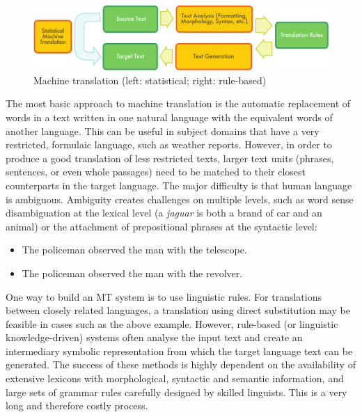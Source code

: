 \begin{multicols}{2}
\begin{figure}[htb]
  \center
  \includegraphics[width=\textwidth]{../_media/english/machine_translation}
  \caption{Machine translation (left: statistical; right: rule-based)}
  \label{fig:mtarch_en}
\end{figure}


The most basic approach to machine translation is the automatic replacement of words in a text written in one natural language with the equivalent words of another language. This can be useful in subject domains that have a very restricted, formulaic language, such as weather reports. However, in order to produce a good translation of less restricted texts, larger text units (phrases, sentences, or even whole passages) need to be matched to their closest counterparts in the target language. The major difficulty is that human language is ambiguous. Ambiguity creates challenges on multiple levels, such as word sense disambiguation at the lexical level (a \textit{jaguar} is both a brand of car and an animal) or the attachment of prepositional phrases at the syntactic level:

\begin{itemize}
\item The policeman observed the man with the telescope.
\item The policeman observed the man with the revolver.
\end{itemize}

One way to build an MT system is to use linguistic rules. For translations between closely related languages, a translation using direct substitution may be feasible in cases such as the above example. However, rule-based (or linguistic knowledge-driven) systems often analyse the input text and create an intermediary symbolic representation from which the target language text can be generated. The success of these methods is highly dependent on the availability of extensive lexicons with morphological, syntactic and semantic information, and large sets of grammar rules carefully designed by skilled linguists. This is a very long and therefore costly process.


\end{multicols}
